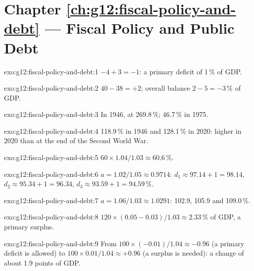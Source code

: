 \section*{Chapter \ref{ch:g12:fiscal-policy-and-debt} --- Fiscal Policy and Public Debt}

\begin{solution}{exo:g12:fiscal-policy-and-debt:1}
$-4 + 3 = -1$: a primary deficit of 1\,\% of GDP.
\end{solution}

\begin{solution}{exo:g12:fiscal-policy-and-debt:2}
 $40 - 38 = +2$; overall balance $2 - 5 = -3$\,\% of GDP.
\end{solution}

\begin{solution}{exo:g12:fiscal-policy-and-debt:3}
In 1946, at 269.8\,\%; 46.7\,\% in 1975.
\end{solution}

\begin{solution}{exo:g12:fiscal-policy-and-debt:4}
118.9\,\% in 1946 and 128.1\,\% in 2020: higher in 2020 than at the end of the Second World War.
\end{solution}

\begin{solution}{exo:g12:fiscal-policy-and-debt:5}
$60 \times 1.04/1.03 \approx 60.6\,\%$.
\end{solution}

\begin{solution}{exo:g12:fiscal-policy-and-debt:6}
$a = 1.02/1.05 \approx 0.9714$: $d_1 \approx 97.14 + 1 = 98.14$, $d_2 \approx 95.34 + 1 = 96.34$, $d_3 \approx 93.59 + 1 = 94.59\,\%$.
\end{solution}

\begin{solution}{exo:g12:fiscal-policy-and-debt:7}
$a = 1.06/1.03 \approx 1.0291$: 102.9, 105.9 and 109.0\,\%.
\end{solution}

\begin{solution}{exo:g12:fiscal-policy-and-debt:8}
$120 \times (0.05 - 0.03)/1.03 \approx 2.33\,\%$ of GDP, a primary surplus.
\end{solution}

\begin{solution}{exo:g12:fiscal-policy-and-debt:9}
From $100 \times (-0.01)/1.04 \approx -0.96$ (a primary deficit is allowed) to $100 \times 0.01/1.04 \approx +0.96$ (a surplus is needed): a change of about 1.9 points of GDP.
\end{solution}

